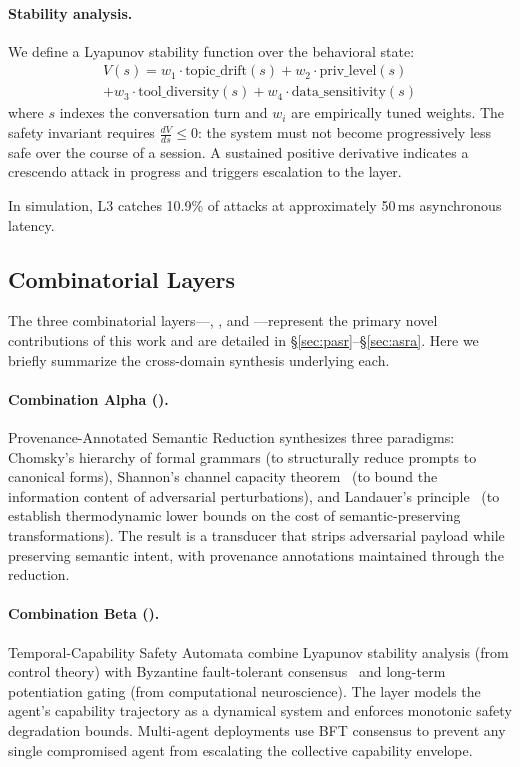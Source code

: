 \paragraph{Stability analysis.} We define a Lyapunov stability function over the behavioral state:
\begin{multline}
V(s) = w_1 \cdot \text{topic\_drift}(s) + w_2 \cdot \text{priv\_level}(s) \\
       + w_3 \cdot \text{tool\_diversity}(s) + w_4 \cdot \text{data\_sensitivity}(s)
\label{eq:lyapunov}
\end{multline}
where $s$ indexes the conversation turn and $w_i$ are empirically tuned weights. The safety invariant requires $\frac{dV}{ds} \leq 0$: the system must not become progressively less safe over the course of a session. A sustained positive derivative indicates a crescendo attack in progress and triggers escalation to the \tcsa layer.

In simulation, L3 catches 10.9\% of attacks at approximately 50\,ms asynchronous latency.

\subsection{Combinatorial Layers}
\label{sec:arch:combo}

The three combinatorial layers---\pasr, \tcsa, and \asra---represent the primary novel contributions of this work and are detailed in \S\ref{sec:pasr}--\S\ref{sec:asra}. Here we briefly summarize the cross-domain synthesis underlying each.

\paragraph{Combination Alpha (\pasr).} Provenance-Annotated Semantic Reduction synthesizes three paradigms: Chomsky's hierarchy of formal grammars (to structurally reduce prompts to canonical forms), Shannon's channel capacity theorem~\cite{shannon1948} (to bound the information content of adversarial perturbations), and Landauer's principle~\cite{landauer1961} (to establish thermodynamic lower bounds on the cost of semantic-preserving transformations). The result is a transducer that strips adversarial payload while preserving semantic intent, with provenance annotations maintained through the reduction.

\paragraph{Combination Beta (\tcsa).} Temporal-Capability Safety Automata combine Lyapunov stability analysis (from control theory) with Byzantine fault-tolerant consensus~\cite{lamport1982} and long-term potentiation gating (from computational neuroscience). The \tcsa layer models the agent's capability trajectory as a dynamical system and enforces monotonic safety degradation bounds. Multi-agent deployments use BFT consensus to prevent any single compromised agent from escalating the collective capability envelope.

